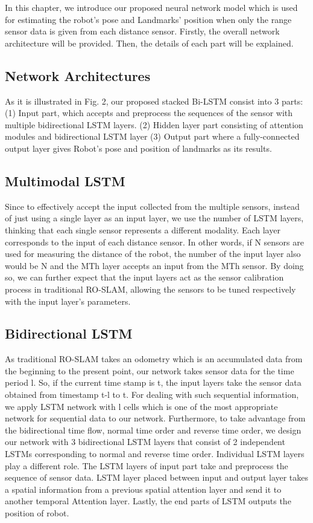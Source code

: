 \documentclass[letterpaper, 10 pt, conference]{ieeeconf}  %
\begin{document}
In this chapter, we introduce our proposed neural network model which is used for estimating the robot’s pose and Landmarks’ position when only the range sensor data is given from each distance sensor. Firstly, the overall network architecture will be provided. Then, the details of each part will be explained.   

\subsection{Network Architectures}

As it is illustrated in Fig. 2, our proposed stacked Bi-LSTM consist into 3 parts: (1) Input part, which accepts and preprocess the sequences of the sensor with multiple bidirectional LSTM layers. (2) Hidden layer part consisting of attention modules and bidirectional LSTM layer (3) Output part where a fully-connected output layer gives Robot’s pose and position of landmarks as its results. 

\subsection{Multimodal LSTM}

Since to effectively accept the input collected from the multiple sensors, instead of just using a single layer as an input layer, we use the number of LSTM layers, thinking that each single sensor represents a different modality. Each layer corresponds to the input of each distance sensor. In other words, if N sensors are used for measuring the distance of the robot, the number of the input layer also would be N and the MTh layer accepts an input from the MTh sensor. By doing so, we can further expect that the input layers act as the sensor calibration process in traditional RO-SLAM, allowing the sensors to be tuned respectively with the input layer’s parameters.

\subsection{Bidirectional LSTM}

As traditional RO-SLAM \cite{blanco2008pure,blanco2008efficient} takes an odometry which is an accumulated data from the beginning to the present point, our network takes sensor data for the time period l. So, if the current time stamp is t, the input layers take the sensor data obtained from timestamp t-l to t. For dealing with such sequential information, we apply LSTM network with l cells which is one of the most appropriate network for sequential data to our network. Furthermore, to take advantage from the bidirectional time flow, normal time order and reverse time order, we design our network with 3 bidirectional LSTM layers that consist of 2 independent LSTMs corresponding to normal and reverse time order. Individual LSTM layers play a different role. The LSTM layers of input part take and preprocess the sequence of sensor data. LSTM layer placed between input and output layer takes a spatial information from a previous spatial attention layer and send it to another temporal Attention layer. Lastly, the end parts of LSTM outputs the position of robot.
\end{document}
